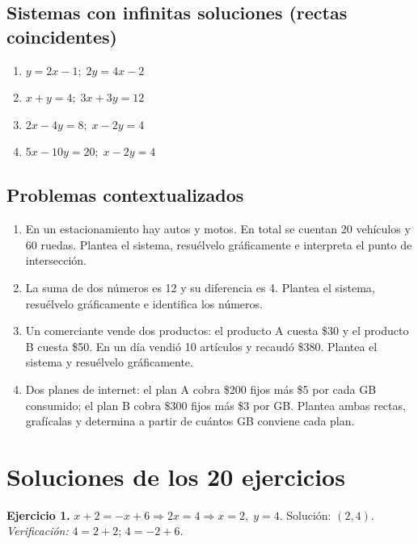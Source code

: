 \documentclass[12pt]{article}
\begin{document}
\subsection{Sistemas con infinitas soluciones (rectas coincidentes)}

\begin{enumerate}[leftmargin=*, itemsep=0.6em, start=13]
  \item \(y = 2x-1;\; 2y = 4x-2\)
  \item \(x+y = 4;\; 3x+3y = 12\)
  \item \(2x-4y = 8;\; x-2y = 4\)
  \item \(5x-10y = 20;\; x-2y = 4\)
\end{enumerate}

\subsection{Problemas contextualizados}

\begin{enumerate}[leftmargin=*, itemsep=0.6em, start=17]
  \item En un estacionamiento hay autos y motos. En total se cuentan 20 vehículos y 60 ruedas. Plantea el sistema, resuélvelo gráficamente e interpreta el punto de intersección.
  \item La suma de dos números es 12 y su diferencia es 4. Plantea el sistema, resuélvelo gráficamente e identifica los números.
  \item Un comerciante vende dos productos: el producto A cuesta \$30 y el producto B cuesta \$50. En un día vendió 10 artículos y recaudó \$380. Plantea el sistema y resuélvelo gráficamente.
  \item Dos planes de internet: el plan A cobra \$200 fijos más \$5 por cada GB consumido; el plan B cobra \$300 fijos más \$3 por GB. Plantea ambas rectas, grafícalas y determina a partir de cuántos GB conviene cada plan.
\end{enumerate}

\section{Soluciones de los 20 ejercicios}

\textbf{Ejercicio 1.} \(x+2=-x+6 \Rightarrow 2x=4 \Rightarrow x=2,\; y=4\). Solución: \((2,4)\). \textit{Verificación:} \(4=2+2\); \(4=-2+6\). \checkmark
\end{document}
